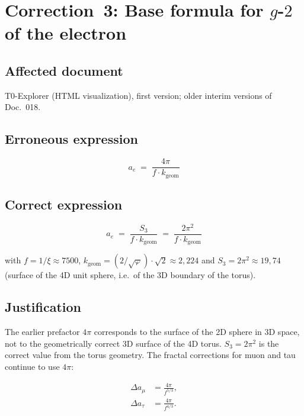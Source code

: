 \section{\texorpdfstring{Correction~3: Base formula for $g$-$2$ of the electron}{Correction 3: Base formula for g-2 of the electron}}

\subsection*{Affected document}

T0-Explorer (HTML visualization), first version; older interim versions
of Doc.~018.

\subsection*{Erroneous expression}

\begin{equation}
  a_e \;=\; \frac{4\pi}{f \cdot k_{\text{geom}}}
  \tag{old -- wrong}
\end{equation}

\subsection*{Correct expression}

\begin{equation}
  \boxed{
    a_e \;=\; \frac{S_3}{f \cdot k_{\text{geom}}}
    \;=\; \frac{2\pi^2}{f \cdot k_{\text{geom}}}
  }
  \tag{190.4}
\end{equation}

with $f = 1/\xi \approx 7500$, $k_{\text{geom}} = (2/\sqrt{\varphi})\cdot\sqrt{2} \approx 2{,}224$
and $S_3 = 2\pi^2 \approx 19{,}74$ (surface of the 4D unit sphere,
i.e.\ of the 3D boundary of the torus).

\subsection*{Justification}

The earlier prefactor $4\pi$ corresponds to the surface of the 2D sphere in 3D
space, not to the geometrically correct 3D surface of the 4D torus.
$S_3 = 2\pi^2$ is the correct value from the torus geometry. The fractal
corrections for muon and tau continue to use $4\pi$:

\begin{align}
  \Delta a_\mu  &= \frac{4\pi}{f^{5/3}}, \tag{190.5}\\
  \Delta a_\tau &= \frac{4\pi}{f^{4/3}}. \tag{190.6}
\end{align}


